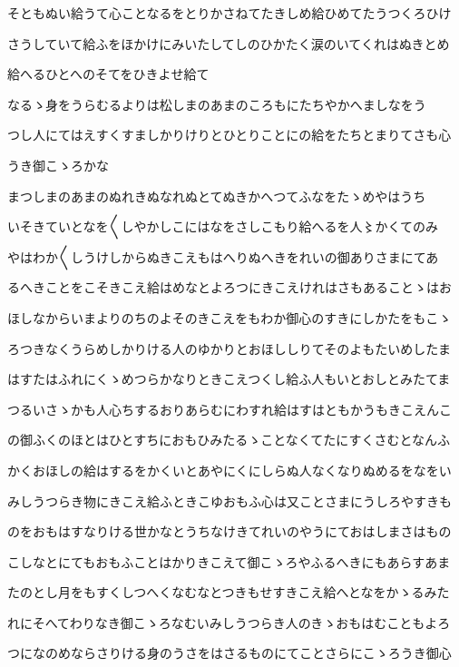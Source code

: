 \documentclass[a4paper,11pt,landscape]{ltjtarticle}
\begin{document}
\par\medskip
そともぬい給うて心ことなるをとりかさねてたきしめ給ひめてたうつくろひけ
\par\medskip
さうしていて給ふをほかけにみいたしてしのひかたく涙のいてくれはぬきとめ
\par\medskip
給へるひとへのそてをひきよせ給て
\par\medskip
なるゝ身をうらむるよりは松しまのあまのころもにたちやかへましなをう
\par\medskip
つし人にてはえすくすましかりけりとひとりことにの給をたちとまりてさも心
\par\medskip
うき御こゝろかな
\par\medskip
まつしまのあまのぬれきぬなれぬとてぬきかへつてふなをたゝめやはうち
\par\medskip
いそきていとなを〱しやかしこにはなをさしこもり給へるを人〻かくてのみ
\par\medskip
やはわか〱しうけしからぬきこえもはへりぬへきをれいの御ありさまにてあ
\par\medskip
るへきことをこそきこえ給はめなとよろつにきこえけれはさもあることゝはお
\par\medskip
ほしなからいまよりのちのよそのきこえをもわか御心のすきにしかたをもこゝ
\par\medskip
ろつきなくうらめしかりける人のゆかりとおほししりてそのよもたいめしたま
\par\medskip
はすたはふれにくゝめつらかなりときこえつくし給ふ人もいとおしとみたてま
\par\medskip
つるいさゝかも人心ちするおりあらむにわすれ給はすはともかうもきこえんこ
\par\medskip
の御ふくのほとはひとすちにおもひみたるゝことなくてたにすくさむとなんふ
\par\medskip
かくおほしの給はするをかくいとあやにくにしらぬ人なくなりぬめるをなをい
\par\medskip
みしうつらき物にきこえ給ふときこゆおもふ心は又ことさまにうしろやすきも
\par\medskip
のをおもはすなりける世かなとうちなけきてれいのやうにておはしまさはもの
\par\medskip
こしなとにてもおもふことはかりきこえて御こゝろやふるへきにもあらすあま
\par\medskip
たのとし月をもすくしつへくなむなとつきもせすきこえ給へとなをかゝるみた
\par\medskip
れにそへてわりなき御こゝろなむいみしうつらき人のきゝおもはむこともよろ
\par\medskip
つになのめならさりける身のうさをはさるものにてことさらにこゝろうき御心
\end{document}

